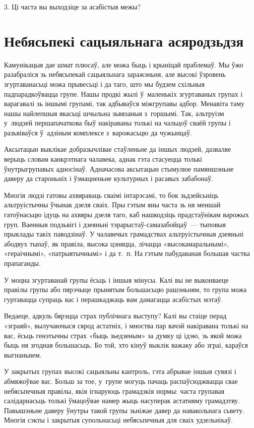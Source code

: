 3. Ці часта вы выходзіце за асабістыя межы?


\section{Небясьпекі сацыяльнага асяродзьдзя}

Камунікацыя дае шмат плюсаў, але можа быць і крыніцай праблемаў. Мы ўжо разабраліся зь небясьпекай сацыяльнага заражэньня, але высокі ўзровень згуртаванасьці можа прывесьці і да таго, што мы будзем схільныя падпарадкоўвацца групе. Нашы продкі жылі ў~маленькіх згуртаваных групах і варагавалі зь іншымі групамі, так адбываўся міжгрупавы адбор. Менавіта таму нашы найлепшыя якасьці шчыльна зьвязаныя з~горшымі. Так, альтруізм у~людзей першапачаткова быў накіраваны толькі на чальцоў сваёй групы і разьвіваўся ў~адзіным комплексе з~варожасьцю да чужынцаў. 

Аксытацын выклікае добразычлівае стаўленьне да іншых людзей, дазваляе верыць словам канкрэтнага чалавека, аднак гэта стасуецца толькі ўнутрыгрупавых адносінаў. Адначасова аксытацын стымулюе памяншэньне даверу да староньніх і ўзмацненьне культурных і расавых забабонаў.

Многія людзі гатовы ахвяраваць сваімі інтарэсамі, то бок зьдзейсьніць альтруістычны ўчынак дзеля сваіх. Пры гэтым яны часта зь ня меншай гатоўнасьцю ідуць на ахвяры дзеля таго, каб нашкодзіць прадстаўнікам варожых груп. Ваенныя подзьвігі і дзеяньні тэрарыстаў-самазабойцаў~--- тыповыя прыклады такіх паводзінаў. У чалавечых грамадствах альтруістычныя дзеяньні абодвух тыпаў, як правіла, высока цэняцца, лічацца «высокамаральнымі», «гераічнымі», «патрыятычнымі» і да т.~п. На гэтым пабудаваная большая частка прапаганды.

У моцна згуртаванай групы ёсьць і іншыя мінусы. Калі вы не выконваеце правілы групы або пярэчыце прынятым большасьцю рашэньням, то група можа гуртавацца супраць вас і перашкаджаць вам дамагацца асабістых мэтаў.

Ведаеце, адкуль бярэцца страх публічнага выступу? Калі вы стаіце перад «зграяй», вылучаючыся сярод астатніх, і мноства пар вачэй накіравана толькі на вас, ёсьць генэтычны страх «быць зьедзеным» за думку ці ідэю, зь якой можа быць ня згодная большасьць. Бо той, хто кінуў выклік важаку або зграі, караўся выгнаньнем.

У закрытых групах высокі сацыяльны кантроль, гэта абрывае іншыя сувязі і абмяжоўвае вас. Больш за тое, у~групе могуць пачаць распаўсюджвацца свае небясьпечныя правілы, якія ігнаруюць грамадзкія нормы: часта групавая салідарнасьць толькі ўмацоўвае намер жыць насуперак астатняму грамадзтву. Павышэньне даверу ўнутры такой групы зьніжае давер да навакольнага сьвету. Многія сэкты і закрытыя супольнасьці небясьпечныя для сваіх удзельнікаў.

